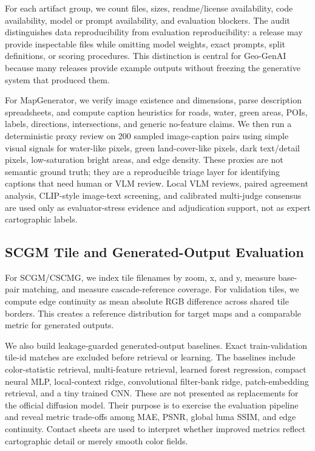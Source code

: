 \documentclass[]{interact}
\begin{document}
For each artifact group, we count files, sizes, readme/license availability, code availability, model or prompt availability, and evaluation blockers. The audit distinguishes data reproducibility from evaluation reproducibility: a release may provide inspectable files while omitting model weights, exact prompts, split definitions, or scoring procedures. This distinction is central for Geo-GenAI because many releases provide example outputs without freezing the generative system that produced them.

For MapGenerator, we verify image existence and dimensions, parse description spreadsheets, and compute caption heuristics for roads, water, green areas, POIs, labels, directions, intersections, and generic no-feature claims. We then run a deterministic proxy review on 200 sampled image-caption pairs using simple visual signals for water-like pixels, green land-cover-like pixels, dark text/detail pixels, low-saturation bright areas, and edge density. These proxies are not semantic ground truth; they are a reproducible triage layer for identifying captions that need human or VLM review. Local VLM reviews, paired agreement analysis, CLIP-style image-text screening, and calibrated multi-judge consensus are used only as evaluator-stress evidence and adjudication support, not as expert cartographic labels.

\subsection{SCGM Tile and Generated-Output Evaluation}

For SCGM/CSCMG, we index tile filenames by zoom, x, and y, measure base-pair matching, and measure cascade-reference coverage. For validation tiles, we compute edge continuity as mean absolute RGB difference across shared tile borders. This creates a reference distribution for target maps and a comparable metric for generated outputs.

We also build leakage-guarded generated-output baselines. Exact train-validation tile-id matches are excluded before retrieval or learning. The baselines include color-statistic retrieval, multi-feature retrieval, learned forest regression, compact neural MLP, local-context ridge, convolutional filter-bank ridge, patch-embedding retrieval, and a tiny trained CNN. These are not presented as replacements for the official diffusion model. Their purpose is to exercise the evaluation pipeline and reveal metric trade-offs among MAE, PSNR, global luma SSIM, and edge continuity. Contact sheets are used to interpret whether improved metrics reflect cartographic detail or merely smooth color fields.
\end{document}

